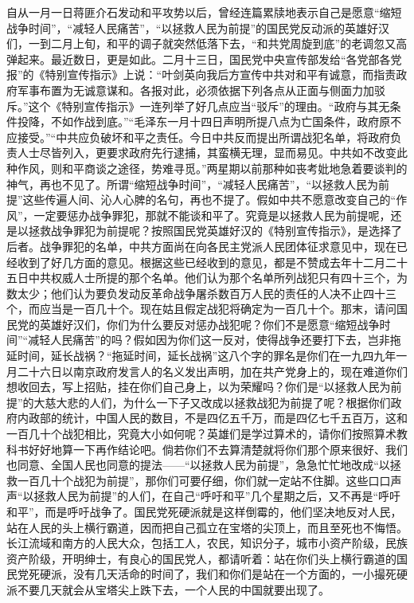 \documentclass[UTF-8, a5paper, 12pt]{ctexart}
\begin{document}
自从一月一日蒋匪介石发动和平攻势以后，曾经连篇累牍地表示自己是愿意“缩短战争时间”，“减轻人民痛苦”，“以拯救人民为前提”的国民党反动派的英雄好汉们，一到二月上旬，和平的调子就突然低落下去，“和共党周旋到底”的老调忽又高弹起来。最近数日，更是如此。二月十三日，国民党中央宣传部发给“各党部各党报”的《特别宣传指示》上说：“叶剑英向我后方宣传中共对和平有诚意，而指责政府军事布置为无诚意谋和。各报对此，必须依据下列各点从正面与侧面力加驳斥。”这个《特别宣传指示》一连列举了好几点应当“驳斥”的理由。“政府与其无条件投降，不如作战到底。”“毛泽东一月十四日声明所提八点为亡国条件，政府原不应接受。”“中共应负破坏和平之责任。今日中共反而提出所谓战犯名单，将政府负责人士尽皆列入，更要求政府先行逮捕，其蛮横无理，显而易见。中共如不改变此种作风，则和平商谈之途径，势难寻觅。”两星期以前那种如丧考妣地急着要谈判的神气，再也不见了。所谓“缩短战争时间”，“减轻人民痛苦”，“以拯救人民为前提”这些传遍人间、沁人心脾的名句，再也不提了。假如中共不愿意改变自己的“作风”，一定要惩办战争罪犯，那就不能谈和平了。究竟是以拯救人民为前提呢，还是以拯救战争罪犯为前提呢？按照国民党英雄好汉的《特别宣传指示》，是选择了后者。战争罪犯的名单，中共方面尚在向各民主党派人民团体征求意见中，现在已经收到了好几方面的意见。根据这些已经收到的意见，都是不赞成去年十二月二十五日中共权威人士所提的那个名单。他们认为那个名单所列战犯只有四十三个，为数太少；他们认为要负发动反革命战争屠杀数百万人民的责任的人决不止四十三个，而应当是一百几十个。现在姑且假定战犯将确定为一百几十个。那末，请问国民党的英雄好汉们，你们为什么要反对惩办战犯呢？你们不是愿意“缩短战争时间”“减轻人民痛苦”的吗？假如因为你们这一反对，使得战争还要打下去，岂非拖延时间，延长战祸？“拖延时间，延长战祸”这八个字的罪名是你们在一九四九年一月二十六日以南京政府发言人的名义发出声明，加在共产党身上的，现在难道你们想收回去，写上招贴，挂在你们自己身上，以为荣耀吗？你们是“以拯救人民为前提”的大慈大悲的人们，为什么一下子又改成以拯救战犯为前提了呢？根据你们政府内政部的统计，中国人民的数目，不是四亿五千万，而是四亿七千五百万，这和一百几十个战犯相比，究竟大小如何呢？英雄们是学过算术的，请你们按照算术教科书好好地算一下再作结论吧。倘若你们不去算清楚就将你们那个原来很好、我们也同意、全国人民也同意的提法——“以拯救人民为前提”，急急忙忙地改成“以拯救一百几十个战犯为前提”，那你们可要仔细，你们就一定站不住脚。这些口口声声“以拯救人民为前提”的人们，在自己“呼吁和平”几个星期之后，又不再是“呼吁和平”，而是呼吁战争了。国民党死硬派就是这样倒霉的，他们坚决地反对人民，站在人民的头上横行霸道，因而把自己孤立在宝塔的尖顶上，而且至死也不悔悟。长江流域和南方的人民大众，包括工人，农民，知识分子，城市小资产阶级，民族资产阶级，开明绅士，有良心的国民党人，都请听着：站在你们头上横行霸道的国民党死硬派，没有几天活命的时间了，我们和你们是站在一个方面的，一小撮死硬派不要几天就会从宝塔尖上跌下去，一个人民的中国就要出现了。 
\end{document}
